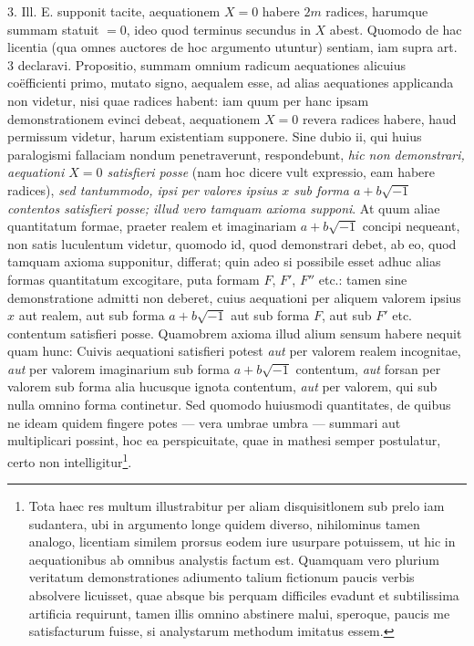 \documentclass[14pt]{memoir}
\theoremstyle{plain}
\theoremstyle{remark}
\begin{document}
3. Ill. \textsc{E.} supponit tacite, aequationem \(X=0\) habere \(2m\) radices, harumque summam statuit \(= 0\), ideo quod terminus secundus in \(X\) abest. Quomodo de hac licentia (qua omnes auctores de hoc argumento utuntur) sentiam, iam supra art. 3 declaravi. Propositio, summam omnium radicum aequationes alicuius co\"efficienti primo, mutato signo, aequalem esse, ad alias aequationes applicanda non videtur, nisi quae radices habent: iam quum per hanc ipsam demonstrationem evinci debeat, aequationem \(X = 0\) revera radices habere, haud permissum videtur, harum existentiam supponere. Sine dubio ii, qui huius paralogismi fallaciam nondum penetraverunt, respondebunt, \textit{hic non demonstrari, aequationi \(X= 0\) satisfieri posse} (nam hoc dicere vult expressio, eam habere radices), \textit{sed tantummodo, ipsi per valores ipsius \(x\) sub forma \(a + b \surd{-1}\) contentos satisfieri posse; illud vero tamquam axioma supponi}. At quum aliae quantitatum formae, praeter realem et imaginariam \(a + b \surd{-1}\) concipi nequeant, non satis luculentum videtur, quomodo id, quod demonstrari debet, ab eo, quod tamquam axioma supponitur, differat; quin adeo si possibile esset adhuc alias formas quantitatum excogitare, puta formam \(F\), \(F'\), \(F''\) etc.: tamen sine demonstratione admitti non deberet, cuius aequationi per aliquem valorem ipsius \(x\) aut realem, aut sub forma \(a + b \surd{-1}\) aut sub forma \(F\), aut sub \(F'\) etc. contentum satisfieri posse. Quamobrem axioma illud alium sensum habere nequit quam hunc: Cuivis aequationi satisfieri potest \textit{aut} per valorem realem incognitae, \textit{aut} per valorem imaginarium sub forma \(a + b \surd{-1}\) contentum, \textit{aut} forsan per valorem sub forma alia hucusque ignota contentum, \textit{aut} per valorem, qui sub nulla omnino forma continetur. Sed quomodo huiusmodi quantitates, de quibus ne ideam quidem fingere potes — vera umbrae umbra — summari aut multiplicari possint, hoc ea perspicuitate, quae in mathesi semper postulatur, certo non intelligitur\footnote{Tota haec res multum illustrabitur per aliam disquisitlonem sub prelo iam sudantera, ubi in argumento longe quidem diverso, nihilominus tamen analogo, licentiam similem prorsus eodem iure usurpare potuissem, ut hic in aequationibus ab omnibus analystis factum est. Quamquam vero plurium veritatum demonstrationes adiumento talium fictionum paucis verbis absolvere licuisset, quae absque bis perquam difficiles evadunt et subtilissima artificia requirunt, tamen illis omnino abstinere malui, speroque, paucis me satisfacturum fuisse, si analystarum methodum imitatus essem.}.
\end{document}
